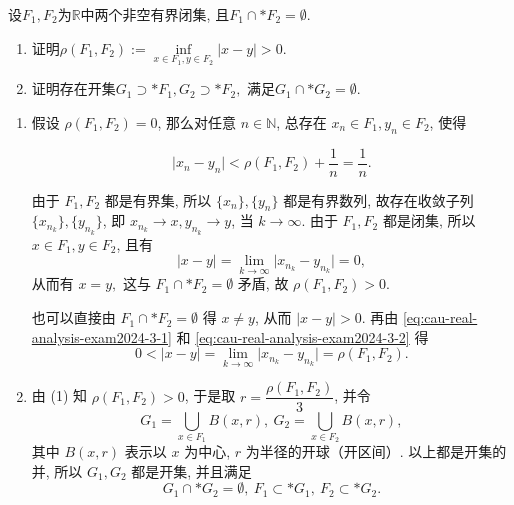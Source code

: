 
\begin{question}[points = 10]
  设$F_1, F_2$为$\mathbb{R}$中两个非空有界闭集, 且$F_1 \cap* F_2 = \emptyset.$
  \begin{enumerate}
    \item 证明$\rho(F_1, F_2) := \inf\limits_{x\in F_1, y\in F_2} \lvert x - y \rvert > 0.$
    \item 证明存在开集$G_1 \supset* F_1, G_2 \supset* F_2,$ 满足$G_1 \cap* G_2 = \emptyset.$
  \end{enumerate}

\end{question}

\begin{solution}
  \begin{enumerate}
    \item 假设 \(\rho(F_1, F_2) = 0\), 那么对任意 \(n \in \mathbb{N}\), 总存在 \(x_n \in F_1, y_n \in F_2\), 使得

    \begin{equation}
    \label{eq:cau-real-analysis-exam2024-3-1}
    \lvert x_n - y_n \rvert < \rho(F_1, F_2) + \dfrac{1}{n} = \dfrac{1}{n}.
    \end{equation}

    由于 \(F_1, F_2\) 都是有界集, 所以 \(\{x_n\}, \{y_n\}\) 都是有界数列, 故存在收敛子列 \(\{x_{n_k}\}, \{y_{n_k}\}\), 即 \(x_{n_k} \to x, y_{n_k} \to y\), 当 \(k \to \infty\). 由于 \(F_1, F_2\) 都是闭集, 所以 \(x \in F_1, y \in F_2\), 且有
    \begin{equation}
    \label{eq:cau-real-analysis-exam2024-3-2}
    \lvert x - y \rvert = \lim\limits_{k\to\infty} \lvert x_{n_k} - y_{n_k} \rvert = 0,
    \end{equation}
    从而有 \(x = y,\) 这与 \(F_1 \cap* F_2 = \emptyset\) 矛盾, 故 \(\rho(F_1, F_2) > 0\).

    也可以直接由 \(F_1 \cap* F_2 = \emptyset\) 得 \(x \neq y\), 从而    \(\lvert x - y \rvert > 0\). 再由 \eqref{eq:cau-real-analysis-exam2024-3-1} 和 \eqref{eq:cau-real-analysis-exam2024-3-2} 得
    \[0 < \lvert x - y \rvert = \lim\limits_{k\to\infty} \lvert x_{n_k} - y_{n_k} \rvert = \rho(F_1, F_2).\]
    \item 由 (1) 知 \(\rho(F_1, F_2) > 0\), 于是取 \(r = \dfrac{\rho(F_1, F_2)}{3}\), 并令
    \[
    G_1 = \bigcup\limits_{x\in F_1} B(x, r), ~ G_2 = \bigcup\limits_{x\in F_2} B(x, r),
    \]
    其中 \(B(x, r)\) 表示以 \(x\) 为中心, \(r\) 为半径的开球（开区间）. 以上都是开集的并, 所以 \(G_1, G_2\) 都是开集, 并且满足
    \[G_1 \cap* G_2 = \emptyset, ~ F_1 \subset* G_1, ~ F_2 \subset* G_2.\]
  \end{enumerate}
\end{solution}


